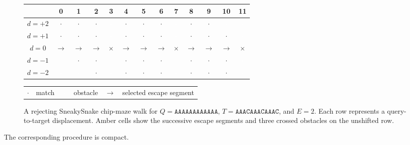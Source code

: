 \begin{figure}[H]
\centering
\begingroup
\small
\setlength{\tabcolsep}{4pt}
\renewcommand{\arraystretch}{1.2}
\newcommand{\mazeMatch}{\cellcolor{white}\(\cdot\)}
\newcommand{\mazeObstacle}{\cellcolor{black!70}\textcolor{white}{\(\times\)}}
\newcommand{\mazeRoute}{\cellcolor{orange!35}\textcolor{orange!80!black}{\(\rightarrow\)}}
\newcommand{\mazeCross}{\cellcolor{orange!70}\(\times\)}
\begin{tabular}{c|*{12}{c}}
 & 0 & 1 & 2 & 3 & 4 & 5 & 6 & 7 & 8 & 9 & 10 & 11\\
\hline
\(d=+2\) & \mazeMatch & \mazeMatch & \mazeMatch & \mazeObstacle &
\mazeMatch & \mazeMatch & \mazeMatch & \mazeObstacle & \mazeMatch &
\mazeMatch & \mazeObstacle & \mazeObstacle\\
\(d=+1\) & \mazeMatch & \mazeMatch & \mazeMatch & \mazeObstacle &
\mazeMatch & \mazeMatch & \mazeMatch & \mazeObstacle & \mazeMatch &
\mazeMatch & \mazeMatch & \mazeObstacle\\
\(d=0\) & \mazeRoute & \mazeRoute & \mazeRoute & \mazeCross &
\mazeRoute & \mazeRoute & \mazeRoute & \mazeCross & \mazeRoute &
\mazeRoute & \mazeRoute & \mazeCross\\
\(d=-1\) & \mazeObstacle & \mazeMatch & \mazeMatch & \mazeObstacle &
\mazeMatch & \mazeMatch & \mazeMatch & \mazeObstacle & \mazeMatch &
\mazeMatch & \mazeMatch & \mazeObstacle\\
\(d=-2\) & \mazeObstacle & \mazeObstacle & \mazeMatch & \mazeObstacle &
\mazeMatch & \mazeMatch & \mazeMatch & \mazeObstacle & \mazeMatch &
\mazeMatch & \mazeMatch & \mazeObstacle\\
\end{tabular}

\vspace{0.4em}
\begin{tabular}{clclcl}
\cellcolor{white}\(\cdot\) & match &
\cellcolor{black!70}\textcolor{white}{\(\times\)} & obstacle &
\cellcolor{orange!35}\(\rightarrow\) & selected escape segment
\end{tabular}
\endgroup
\caption{A rejecting SneakySnake chip-maze walk for
\(Q=\mathtt{AAAAAAAAAAAA}\), \(T=\mathtt{AAACAAACAAAC}\), and \(E=2\).
Each row represents a query-to-target displacement. Amber cells show the
successive escape segments and three crossed obstacles on the unshifted row.}
\label{fig:prefilter-chip-maze}
\end{figure}

The corresponding procedure is compact.

